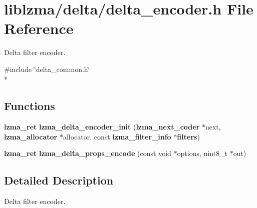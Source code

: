 \section{liblzma/delta/delta\-\_\-encoder.h File Reference}
\label{delta__encoder_8h}


Delta filter encoder.  


{\ttfamily \#include \char`\"{}delta\-\_\-common.\-h\char`\"{}}\\*
\subsection*{Functions}
\begin{DoxyCompactItemize}
\item 
{\bf lzma\-\_\-ret} {\bfseries lzma\-\_\-delta\-\_\-encoder\-\_\-init} ({\bf lzma\-\_\-next\-\_\-coder} $\ast$next, {\bf lzma\-\_\-allocator} $\ast$allocator, const {\bf lzma\-\_\-filter\-\_\-info} $\ast${\bf filters})\label{delta__encoder_8h_a25a23568a3f2a9802296357475dc26bc}

\item 
{\bf lzma\-\_\-ret} {\bfseries lzma\-\_\-delta\-\_\-props\-\_\-encode} (const void $\ast$options, uint8\-\_\-t $\ast$out)\label{delta__encoder_8h_aeac2126d3a2fc0ab4e32a0d3b0e0fc9e}

\end{DoxyCompactItemize}


\subsection{Detailed Description}
Delta filter encoder. 